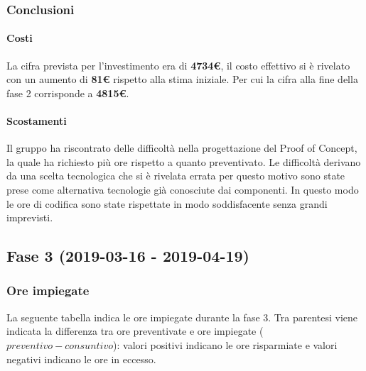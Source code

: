 	\subsubsection{Conclusioni}
		\paragraph{Costi\\}
La cifra prevista per l'investimento era di \textbf{4734€}, il costo effettivo si è rivelato con un aumento di \textbf{81€} rispetto alla stima iniziale. Per cui la cifra alla fine della fase 2 corrisponde a \textbf{4815€}.
 		
		\paragraph{Scostamenti\\}
Il gruppo ha riscontrato delle difficoltà nella progettazione del Proof of Concept, la quale ha richiesto più ore rispetto a quanto preventivato. Le difficoltà derivano da una scelta tecnologica che si è rivelata errata per questo motivo sono state prese come alternativa tecnologie già conosciute dai componenti. In questo modo le ore di codifica sono state rispettate in modo soddisfacente senza grandi imprevisti.
\newpage
\subsection{Fase 3 (2019-03-16 - 2019-04-19)}
	\subsubsection{Ore impiegate}
	La seguente tabella indica le ore impiegate durante la fase 3. Tra parentesi viene indicata la differenza tra ore preventivate e ore impiegate ($preventivo - consuntivo$): valori positivi indicano le ore risparmiate e valori negativi indicano le ore in eccesso.
	
